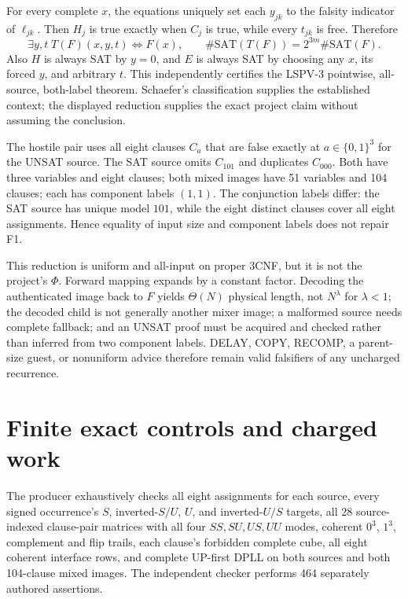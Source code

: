 \documentclass[11pt]{article}
\begin{document}
For every complete $x$, the equations uniquely set each $y_{jk}$ to the
falsity indicator of $\ell_{jk}$.  Then $H_j$ is true exactly when $C_j$ is
true, while every $t_{jk}$ is free.  Therefore
\[
 \exists y,t\;T(F)(x,y,t)\iff F(x),\qquad
 \#\mathrm{SAT}(T(F))=2^{3m}\#\mathrm{SAT}(F).
\]
Also $H$ is always SAT by $y=0$, and $E$ is always SAT by choosing any $x$,
its forced $y$, and arbitrary $t$.  This independently certifies the LSPV-3
pointwise, all-source, both-label theorem.  Schaefer's classification supplies
the established context; the displayed reduction supplies the exact project
claim without assuming the conclusion.

The hostile pair uses all eight clauses $C_a$ that are false exactly at
$a\in\{0,1\}^3$ for the UNSAT source.  The SAT source omits $C_{101}$ and
duplicates $C_{000}$.  Both have three variables and eight clauses; both mixed
images have 51 variables and 104 clauses; each has component labels $(1,1)$.
The conjunction labels differ: the SAT source has unique model $101$, while the
eight distinct clauses cover all eight assignments.  Hence equality of input
size and component labels does not repair F1.

This reduction is uniform and all-input on proper 3CNF, but it is not the
project's $\Phi$.  Forward mapping expands by a constant factor.  Decoding the
authenticated image back to $F$ yields $\Theta(N)$ physical length, not
$N^\lambda$ for $\lambda<1$; the decoded child is not generally another mixer
image; a malformed source needs complete fallback; and an UNSAT proof must be
acquired and checked rather than inferred from two component labels.  DELAY,
COPY, RECOMP, a parent-size guest, or nonuniform advice therefore remain valid
falsifiers of any uncharged recurrence.

\section{Finite exact controls and charged work}
The producer exhaustively checks all eight assignments for each source, every
signed occurrence's $S$, inverted-$S/U$, $U$, and inverted-$U/S$ targets, all
28 source-indexed clause-pair matrices with all four $SS,SU,US,UU$ modes,
coherent $0^3$, $1^3$, complement and flip trails, each clause's forbidden
complete cube, all eight coherent interface rows, and complete UP-first DPLL
on both sources and both 104-clause mixed images.  The independent checker
performs 464 separately authored assertions.
\end{document}
